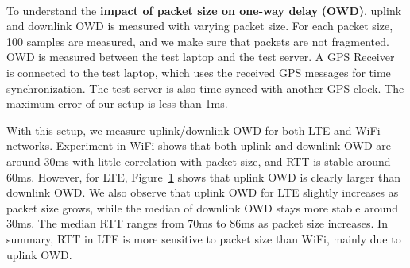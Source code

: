 \label{sec:net.owd}


\begin{figure}[t]
\centering
{} \\
\label{fig:net.len.lte}
\end{figure}


To understand the \textbf{impact of packet size on one-way delay} \textbf{(OWD)}, uplink and downlink OWD is measured with varying packet size. For each packet size, 100 samples are measured, and we make sure that packets are not fragmented. OWD is measured between the test laptop and the test server. A GPS Receiver~\cite{gps} is connected to the test laptop, which uses the received GPS messages for time synchronization. The test server is also time-synced with another GPS clock. The maximum error of our setup is less than 1ms.

With this setup, we measure uplink/downlink OWD for both LTE and WiFi networks.  Experiment in WiFi shows that both uplink and downlink OWD are around 30ms with little correlation with packet size, and RTT is stable around 60ms. However, for LTE, Figure~\ref{fig:net.len.lte} shows that uplink OWD is clearly larger than downlink OWD. We also observe that uplink OWD for LTE slightly increases as packet size grows, while the median of downlink OWD stays more stable around 30ms. The median RTT ranges from 70ms to 86ms as packet size increases. In summary,  RTT in LTE is more sensitive to packet size than WiFi, mainly due to uplink OWD.


